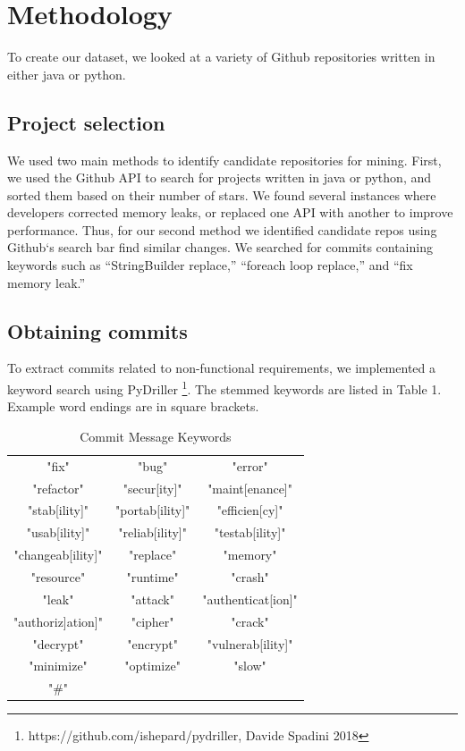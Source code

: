 \documentclass[sigconf]{acmart}
\begin{document}
\section{Methodology}


To create our dataset, we looked at a variety of Github repositories written in either java or python. 


\subsection {Project selection}
We used two main methods to identify candidate repositories for mining. 
First, we used the Github API to search for projects written in java or python, and sorted them based on their number of stars. We found several instances where developers corrected memory leaks, or replaced one API with another to improve performance. Thus, for our second method we identified candidate repos using Github`s search bar find similar changes. We searched for commits containing keywords such as ``StringBuilder replace,'' ``foreach loop replace,'' and ``fix memory leak.''


\subsection{Obtaining commits}
To extract commits related to non-functional requirements, we implemented a keyword search using PyDriller \footnote{https://github.com/ishepard/pydriller, Davide Spadini 2018}. The stemmed keywords are listed in Table 1. Example word endings are in square brackets.

\begin{table}

  \caption{Commit Message Keywords}
  \label{tab:kwds}
\begin{tabular}{  c c c }
\toprule
 "fix"&"bug"&"error"\\
 "refactor"&"secur[ity]" &"maint[enance]"\\
 "stab[ility]"&"portab[ility]"&"efficien[cy]"\\
 "usab[ility]" & "reliab[ility]"&"testab[ility]"\\
 "changeab[ility]"& "replace"&"memory"\\
 "resource"& "runtime"&"crash"\\
 "leak" &"attack" &"authenticat[ion]"\\
 "authoriz]ation]"& "cipher"&"crack" \\ 
 "decrypt"&"encrypt"&"vulnerab[ility]"\\ 
 "minimize"&"optimize"&"slow"\\
 "\#"& &\\
\bottomrule
\end{tabular}
\end{table}
\end{document}
